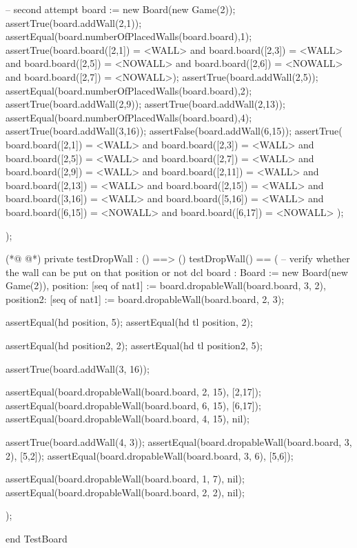 \begin{vdmpp}[breaklines=true]
  -- second attempt
  board := new Board(new Game(2));
  assertTrue(board.addWall(2,1));
  assertEqual(board.numberOfPlacedWalls(board.board),1);
  assertTrue(board.board([2,1]) = <WALL> and board.board([2,3]) = <WALL> and board.board([2,5]) = <NOWALL> and board.board([2,6]) = <NOWALL> and board.board([2,7]) = <NOWALL>);
  assertTrue(board.addWall(2,5));
  assertEqual(board.numberOfPlacedWalls(board.board),2);
  assertTrue(board.addWall(2,9));
  assertTrue(board.addWall(2,13));
  assertEqual(board.numberOfPlacedWalls(board.board),4);
  assertTrue(board.addWall(3,16));
  assertFalse(board.addWall(6,15));
  assertTrue(
   board.board([2,1]) = <WALL> and board.board([2,3]) = <WALL> and board.board([2,5]) = <WALL> and
   board.board([2,7]) = <WALL> and board.board([2,9]) = <WALL> and board.board([2,11]) = <WALL> and
   board.board([2,13]) = <WALL> and board.board([2,15]) = <WALL> and board.board([3,16]) = <WALL> and   
   board.board([5,16]) = <WALL> and board.board([6,15]) = <NOWALL> and board.board([6,17]) = <NOWALL>   
  );
  
 );
 
(*@
\label{testDropWall:96}
@*)
 private testDropWall : () ==> ()
 testDropWall() ==
 (
  -- verify whether the wall can be put on that position or not
  dcl 
  board : Board := new Board(new Game(2)),
  position: [seq of nat1] := board.dropableWall(board.board, 3, 2),
  position2: [seq of nat1] := board.dropableWall(board.board, 2, 3);
  
  assertEqual(hd position, 5);
  assertEqual(hd tl position, 2);
  
  assertEqual(hd position2, 2);
  assertEqual(hd tl position2, 5);
  
  assertTrue(board.addWall(3, 16));
  
  assertEqual(board.dropableWall(board.board, 2, 15), [2,17]);
  assertEqual(board.dropableWall(board.board, 6, 15), [6,17]);
  assertEqual(board.dropableWall(board.board, 4, 15), nil);
  
  assertTrue(board.addWall(4, 3));
  assertEqual(board.dropableWall(board.board, 3, 2), [5,2]);
  assertEqual(board.dropableWall(board.board, 3, 6), [5,6]);
  
  assertEqual(board.dropableWall(board.board, 1, 7), nil);
  assertEqual(board.dropableWall(board.board, 2, 2), nil);
    
 );
 
end TestBoard
\end{vdmpp}
\bigskip

